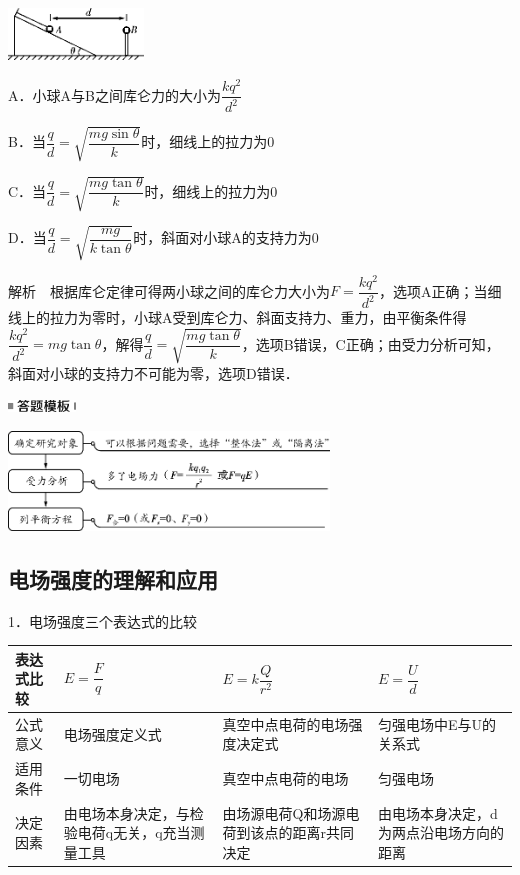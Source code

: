 \begin{center}\includegraphics[width=1.41667in,height=0.54167in]{media/image261.png}\end{center}

A．小球A与B之间库仑力的大小为$\dfrac{kq^2}{d^2}$

B．当$\dfrac{q}{d}=\sqrt{\dfrac{mg\sin\theta}{k}}$时，细线上的拉力为0

C．当$\dfrac{q}{d}=\sqrt{\dfrac{mg\tan\theta}{k}}$时，细线上的拉力为0

D．当$\dfrac{q}{d}=\sqrt{\dfrac{mg}{k\tan\theta}}$时，斜面对小球A的支持力为0

解析　根据库仑定律可得两小球之间的库仑力大小为$F=\dfrac{kq^2}{d^2}$，选项A正确；当细线上的拉力为零时，小球A受到库仑力、斜面支持力、重力，由平衡条件得$\dfrac{kq^2}{d^2}=mg\tan\theta$，解得$\dfrac{q}{d}=\sqrt{\dfrac{mg\tan\theta}{k}}$，选项B错误，C正确；由受力分析可知，斜面对小球的支持力不可能为零，选项D错误．

\begin{center}\includegraphics[width=0.70833in,height=0.125in]{media/image25.png}\end{center}
\begin{center}\includegraphics[width=3.35417in,height=1.04167in]{media/image262.png}\end{center}
\newpage
\subsection{电场强度的理解和应用}

1．电场强度三个表达式的比较

\begin{longtable}[]{@{}m{2cm}m{4cm}m{4cm}m{3cm}@{}}
\toprule

表达式比较&$E=\dfrac{F}{q}$&$E=k\dfrac{Q}{r^2}$&$E=\dfrac{U}{d}$
\tabularnewline
\midrule
\endhead
公式意义 & 电场强度定义式 & 真空中点电荷的电场强度决定式 &
匀强电场中E与U的关系式\tabularnewline
适用条件 & 一切电场 & 真空中点电荷的电场 & 匀强电场\tabularnewline
决定因素 & 由电场本身决定，与检验电荷q无关，q充当测量工具 &
由场源电荷Q和场源电荷到该点的距离r共同决定 &
由电场本身决定，d为两点沿电场方向的距离\tabularnewline
\bottomrule
\end{longtable}

